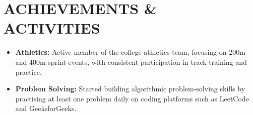 \documentclass[10pt,a4paper]{article}
\begin{document}

\section*{ACHIEVEMENTS \& ACTIVITIES}

\begin{itemize}
    \item \textbf{Athletics:} Active member of the college athletics team, focusing on 200m and 400m sprint events, with consistent participation in track training and practice.
     \item \textbf{Problem Solving:} Started building algorithmic problem-solving skills by practising at least one problem daily on coding platforms such as LeetCode and GeeksforGeeks.
\end{itemize}
\end{document}

